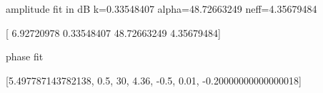 

amplitude fit in dB k=0.33548407 alpha=48.72663249 neff=4.35679484

[  6.92720978   0.33548407  48.72663249   4.35679484]




phase fit 


[5.497787143782138, 0.5, 30, 4.36, -0.5, 0.01, -0.20000000000000018]
